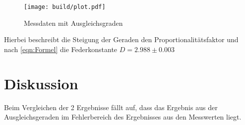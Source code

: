 \documentclass[titlepage = firstcover]{scrartcl}
\begin{document}
\begin{figure}[h]
  \centering
  \texttt{[image: build/plot.pdf]}
  \caption{Messdaten mit Ausgleichsgraden}
  \label{fig:Plot}
\end{figure}

Hierbei beschreibt die Steigung der Geraden den Proportionalitätsfaktor und
nach \eqref{eqn:Formel} die Federkonstante $D=2.988 \pm 0.003$

\newpage
\section{Diskussion}
\label{sec:Diskussion}
Beim Vergleichen der 2 Ergebnisse fällt auf,
dass das Ergebnis aus der Ausgleichsgeraden im Fehlerbereich des Ergebnisses aus den Messwerten liegt.
\end{document}
